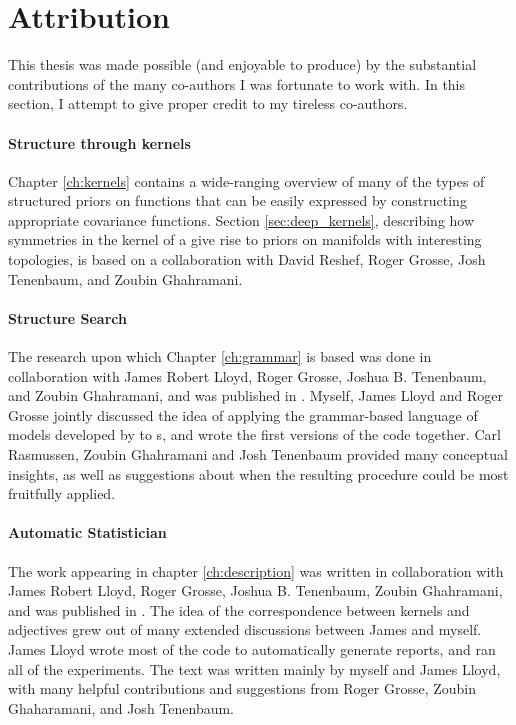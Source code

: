 \section{Attribution}

This thesis was made possible (and enjoyable to produce) by the substantial contributions of the many co-authors I was fortunate to work with.
In this section, I %
attempt to give proper credit to my tireless co-authors.

\paragraph{Structure through kernels}
Chapter \ref{ch:kernels} contains a wide-ranging overview of many of the types of structured priors on functions that can be easily expressed by constructing appropriate covariance functions.
Section \ref{sec:deep_kernels}, describing how symmetries in the kernel of a \gplvm{} give rise to priors on manifolds with interesting topologies, is based on a collaboration with David Reshef, Roger Grosse, Josh Tenenbaum, and Zoubin Ghahramani.

\paragraph{Structure Search}
The research upon which Chapter \ref{ch:grammar} is based was done in collaboration with James Robert Lloyd, Roger Grosse, Joshua B. Tenenbaum, and Zoubin Ghahramani, and was published in \citep{DuvLloGroetal13}.
Myself, James Lloyd and Roger Grosse jointly discussed the idea of applying the grammar-based language of models developed by \citet{grosse2012exploiting} to \gp{}s, and wrote the first versions of the code together.  Carl Rasmussen, Zoubin Ghahramani and Josh Tenenbaum provided many conceptual insights, as well as suggestions about when the resulting procedure could be most fruitfully applied.

\paragraph{Automatic Statistician} The work appearing in chapter \ref{ch:description} was written in collaboration with James Robert Lloyd, Roger Grosse, Joshua B. Tenenbaum, Zoubin Ghahramani, and was published in \citep{LloDuvGroetal14}.
The idea of the correspondence between kernels and adjectives grew out of many extended discussions between James and myself.
James Lloyd wrote most of the code to automatically generate reports, and ran all of the experiments.
The text was written mainly by myself and James Lloyd, with many helpful contributions and suggestions from Roger Grosse, Zoubin Ghaharamani, and Josh Tenenbaum.

